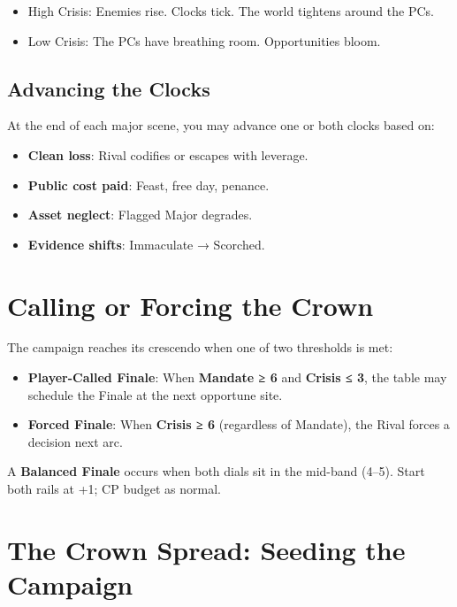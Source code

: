\begin{itemize}
    \item High Crisis: Enemies rise. Clocks tick. The world tightens around the PCs.
    \item Low Crisis: The PCs have breathing room. Opportunities bloom.
\end{itemize}

\subsection*{Advancing the Clocks}

At the end of each major scene, you may advance one or both clocks based on:

\begin{itemize}
    \item \textbf{Clean loss}: Rival codifies or escapes with leverage.
    \item \textbf{Public cost paid}: Feast, free day, penance.
    \item \textbf{Asset neglect}: Flagged Major degrades.
    \item \textbf{Evidence shifts}: Immaculate → Scorched.
\end{itemize}

\section*{Calling or Forcing the Crown}

The campaign reaches its crescendo when one of two thresholds is met:

\begin{itemize}
    \item \textbf{Player-Called Finale}: When \textbf{Mandate ≥ 6} and \textbf{Crisis ≤ 3}, the table may schedule the Finale at the next opportune site.
    \item \textbf{Forced Finale}: When \textbf{Crisis ≥ 6} (regardless of Mandate), the Rival forces a decision next arc.
\end{itemize}

A \textbf{Balanced Finale} occurs when both dials sit in the mid-band (4--5). Start both rails at +1; CP budget as normal.

\section*{The Crown Spread: Seeding the Campaign}


